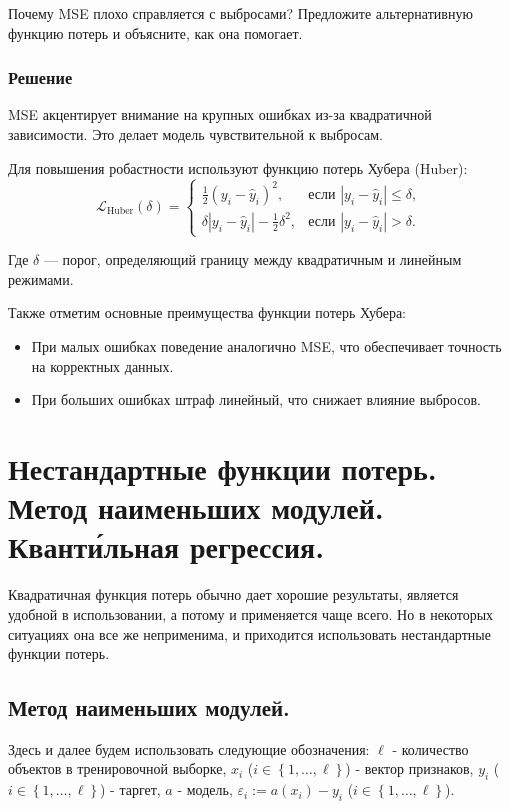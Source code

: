 Почему MSE плохо справляется с выбросами? Предложите альтернативную функцию потерь и объясните, как она помогает.

\subsubsection*{Решение}

MSE акцентирует внимание на крупных ошибках из-за квадратичной зависимости. Это делает модель чувствительной к выбросам.

Для повышения робастности используют функцию потерь Хубера (Huber):
\[
\mathcal{L}_{\text{Huber}}(\delta) = \begin{cases}
\frac{1}{2}(y_i - \hat{y}_i)^2, & \text{если } |y_i - \hat{y}_i| \leq \delta, \\
\delta |y_i - \hat{y}_i| - \frac{1}{2}\delta^2, & \text{если } |y_i - \hat{y}_i| > \delta.
\end{cases}
\]

Где $\delta$ — порог, определяющий границу между квадратичным и линейным режимами.

Также отметим основные преимущества функции потерь Хубера:
\begin{itemize}
    \item При малых ошибках поведение аналогично MSE, что обеспечивает точность на корректных данных.
    \item При больших ошибках штраф линейный, что снижает влияние выбросов.
\end{itemize}










\section*{Нестандартные функции потерь. Метод наименьших модулей. Квант\'{и}льная регрессия.}

Квадратичная функция потерь обычно дает хорошие результаты, является удобной в использовании, а потому и применяется чаще всего. Но в некоторых ситуациях она все же неприменима, и приходится использовать нестандартные функции потерь.

\subsection*{Метод наименьших модулей.}

Здесь и далее будем использовать следующие обозначения: $\ell$ - количество объектов в тренировочной выборке, $x_i$ ($i \in \left\{1, \dotsc, \ell \right\}$) - вектор признаков, $y_i$ ($i \in \left\{1, \dotsc, \ell \right\}$) - таргет, $a$ - модель, $\varepsilon_i := a(x_i) - y_i$ ($i \in \left\{1, \dotsc, \ell \right\}$).

